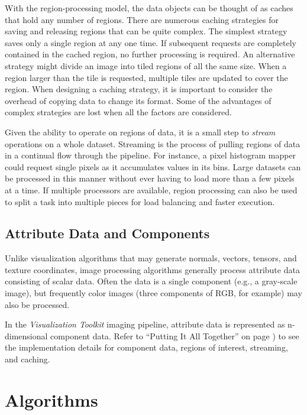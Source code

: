 With the region-processing model, the data objects can be thought of as caches that hold any number of regions. There are numerous caching strategies for saving and releasing regions that can be quite complex. The simplest strategy saves only a single region at any one time. If subsequent requests are completely contained in the cached region, no further processing is required. An alternative strategy might divide an image into tiled regions of all the same size. When a region larger than the tile is requested, multiple tiles are updated to cover the region. When designing a caching strategy, it is important to consider the overhead of copying data to change its format. Some of the advantages of complex strategies are lost when all the factors are considered.

Given the ability to operate on regions of data, it is a small step to \emph{stream} operations on a whole dataset. Streaming is the process of pulling regions of data in a continual flow through the pipeline. For instance, a pixel histogram mapper could request single pixels as it accumulates values in its bins. Large datasets can be processed in this manner without ever having to load more than a few pixels at a time. If multiple processors are available, region processing can also be used to split a task into multiple pieces for load balancing and faster execution.

\subsection{Attribute Data and Components}

Unlike visualization algorithms that may generate normals, vectors, tensors, and texture coordinates, image processing algorithms generally process attribute data consisting of scalar data. Often the data is a single component (e.g., a gray-scale image), but frequently color images (three components of RGB, for example) may also be processed.

In the \emph{Visualization Toolkit} imaging pipeline, attribute data is represented as n-dimensional component data. Refer to ``Putting It All Together'' on page \pageref{sec:chap10.putting_it_all_together}) to see the implementation details for component data, regions of interest, streaming, and caching.

\section{Algorithms}

